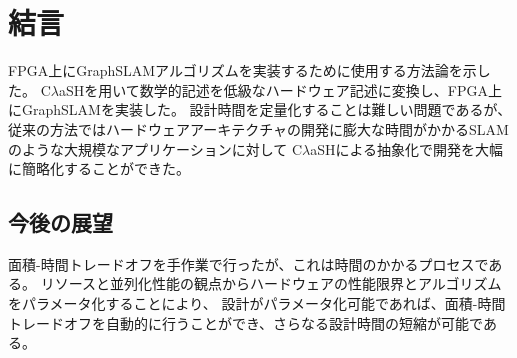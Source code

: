 \documentclass{jsarticle}
\begin{document}
\section{結言}
FPGA上にGraphSLAMアルゴリズムを実装するために使用する方法論を示した。
C$\lambda$aSHを用いて数学的記述を低級なハードウェア記述に変換し、FPGA上にGraphSLAMを実装した。
設計時間を定量化することは難しい問題であるが、
従来の方法ではハードウェアアーキテクチャの開発に膨大な時間がかかるSLAMのような大規模なアプリケーションに対して
C$\lambda$aSHによる抽象化で開発を大幅に簡略化することができた。

\subsection{今後の展望}
面積-時間トレードオフを手作業で行ったが、これは時間のかかるプロセスである。
リソースと並列化性能の観点からハードウェアの性能限界とアルゴリズムをパラメータ化することにより、
設計がパラメータ化可能であれば、面積-時間トレードオフを自動的に行うことができ、さらなる設計時間の短縮が可能である。

\footnotesize



\normalsize
\end{document}
